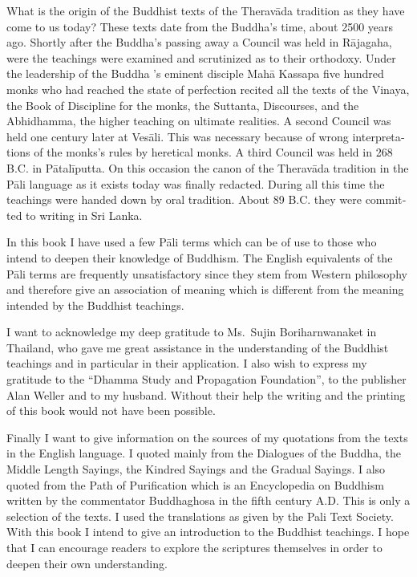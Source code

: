 \documentclass{book}
\begin{document}
What is the origin of the Buddhist texts of the Theravāda tradition as
they have come to us today? These texts date from the Buddha's time,
about 2500 years ago. Shortly after the Buddha's passing away a Council
was held in Rājagaha, were the teachings were examined and scruti­nized
as to their orthodoxy. Under the leadership of the Buddha 's eminent
disciple Mahā Kassapa five hundred monks who had reached the state of
perfection recited all the texts of the Vinaya, the Book of Discipline
for the monks, the Suttanta, Discourses, and the Abhidhamma, the higher
teaching on ultimate real­ities. A second Council was held one century
later at Vesāli. This was necessary because of wrong interpreta­tions of
the monks's rules by heretical monks. A third Council was held in 268
B.C. in Pātalīputta. On this occasion the canon of the Theravāda
tradition in the Pāli language as it exists today was finally redacted.
During all this time the teachings were handed down by oral tradition.
About 89 B.C. they were commit­ted to writing in Sri Lanka.

In this book I have used a few Pāli terms which can be of use to those
who intend to deepen their knowledge of Buddhism. The English
equivalents of the Pāli terms are frequently unsatisfactory since they
stem from Western philosophy and therefore give an association of
meaning which is different from the meaning intended by the Buddhist
teachings.

I want to acknowledge my deep gratitude to Ms.~Sujin Boriharnwanaket in
Thailand, who gave me great assist­ance in the understanding of the
Buddhist teachings and in particular in their application. I also wish
to express my gratitude to the ``Dhamma Study and Propagation
Founda­tion'', to the publisher Alan Weller and to my husband. Without
their help the writing and the printing of this book would not have been
possible.

Finally I want to give information on the sources of my quotations from
the texts in the English language. I quoted mainly from the Dialogues of
the Buddha, the Middle Length Sayings, the Kindred Sayings and the
Gradual Sayings. I also quoted from the Path of Purification which is an
Encyclopedia on Buddhism written by the com­mentator Buddhaghosa in the
fifth century A.D. This is only a selection of the texts. I used the                                 translations as given by the Pali Text Society.  
With this book I intend to give an introduction to the Buddhist
teachings. I hope that I can encourage readers to explore the scriptures
themselves in order to deepen their own understanding.
\end{document}
